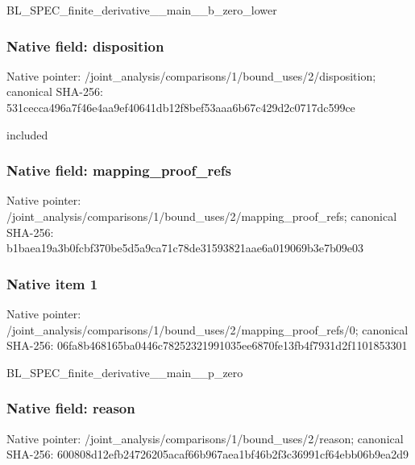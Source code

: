 \documentclass[10pt,a4paper]{article}
\begin{document}
\begingroup\raggedright\sloppy BL\_\allowbreak{}SPEC\_\allowbreak{}finite\_\allowbreak{}derivative\_\allowbreak{}\_\allowbreak{}main\_\allowbreak{}\_\allowbreak{}b\_\allowbreak{}zero\_\allowbreak{}lower\par\endgroup

\subsubsection{Native field: disposition}
Native pointer: /joint\_\allowbreak{}analysis/comparisons/1/bound\_\allowbreak{}uses/2/disposition; canonical SHA-256: 531cecca496a7f46e4aa9ef40641db12f8bef53aaa6b67c429d2c0717dc599ce

\begingroup\raggedright\sloppy included\par\endgroup

\subsubsection{Native field: mapping\_\allowbreak{}proof\_\allowbreak{}refs}
Native pointer: /joint\_\allowbreak{}analysis/comparisons/1/bound\_\allowbreak{}uses/2/mapping\_\allowbreak{}proof\_\allowbreak{}refs; canonical SHA-256: b1baea19a3b0fcbf370be5d5a9ca71c78de31593821aae6a019069b3e7b09e03

\subsubsection{Native item 1}
Native pointer: /joint\_\allowbreak{}analysis/comparisons/1/bound\_\allowbreak{}uses/2/mapping\_\allowbreak{}proof\_\allowbreak{}refs/0; canonical SHA-256: 06fa8b468165ba0446c78252321991035ee6870fe13fb4f7931d2f1101853301

\begingroup\raggedright\sloppy BL\_\allowbreak{}SPEC\_\allowbreak{}finite\_\allowbreak{}derivative\_\allowbreak{}\_\allowbreak{}main\_\allowbreak{}\_\allowbreak{}p\_\allowbreak{}zero\par\endgroup

\subsubsection{Native field: reason}
Native pointer: /joint\_\allowbreak{}analysis/comparisons/1/bound\_\allowbreak{}uses/2/reason; canonical SHA-256: 600808d12efb24726205acaf66b967aea1bf46b2f3c36991cf64ebb06b9ea2d9
\end{document}
